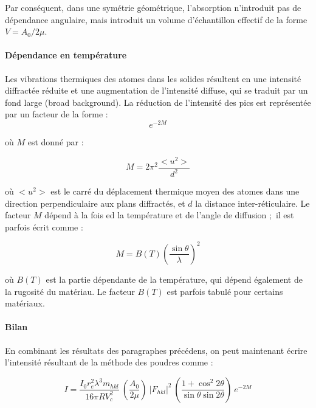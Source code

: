 Par conséquent, dans une symétrie géométrique, l'absorption n'introduit pas de dépendance angulaire, mais introduit un volume d'échantillon effectif de la forme $V = A_0 / 2\mu$.

\paragraph{Dépendance en température}

Les vibrations thermiques des atomes dans les solides résultent en une intensité diffractée réduite et une augmentation de l'intensité diffuse, qui se traduit par un fond large (broad background). La réduction de l'intensité des pics est représentée par un facteur de la forme :
\begin{equation}
    e^{-2M}
\end{equation}

où $M$ est donné par :

\begin{equation}
    M = 2 \pi^2 \frac{<u^2>}{d^2}
\end{equation}

où $<u^2>$ est le carré du déplacement thermique moyen des atomes dans une direction perpendiculaire aux plans diffractés, et $d$ la distance inter-réticulaire. Le facteur $M$ dépend à la fois ed la température et de l'angle de diffusion ; il est parfois écrit comme :

\begin{equation}
    M = B(T) \left( \frac{\sin \theta}{\lambda} \right)^2
\end{equation}

où $B(T)$ est la partie dépendante de la température, qui dépend également de la rugosité du matériau. Le facteur $B(T)$ est parfois tabulé pour certains matériaux.

\paragraph{Bilan}

En combinant les résultats des paragraphes précédens, on peut maintenant écrire l'intensité résultant de la méthode des poudres comme :

\begin{equation}
    I = 
        \frac{I_0 r_e^2 \lambda^3 m_{hkl}}{16\pi R V_c^2}\ 
        \left(\frac{A_0}{2\mu} \right) \
        |F_{hkl}|^2 \ 
        \left( \frac{1+\cos^2 2\theta}{\sin\theta \sin 2\theta} \right)\ 
        e^{-2M}
\end{equation}

